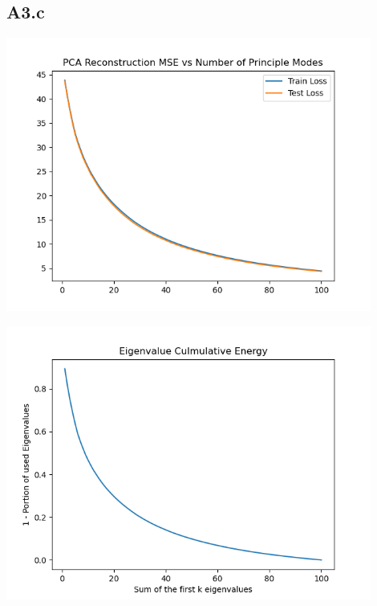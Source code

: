 \documentclass[]{article}
\begin{document}
    \subsection*{A3.c}
        \begin{center}
            \includegraphics*[width=12cm]{A3plots/01-22-47-PCA-restruct-MSE.png}
        \end{center}
        \begin{center}
            \includegraphics*[width=12cm]{A3plots/22-18-12-PCA-restruct-Energy.png}
        \end{center}
\end{document}
